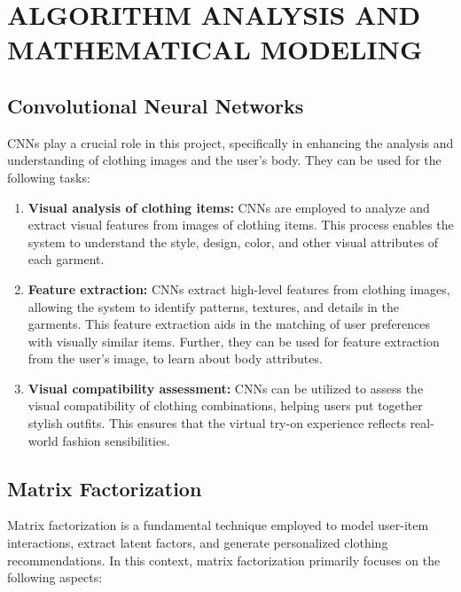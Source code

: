 \chapter{ALGORITHM ANALYSIS AND MATHEMATICAL MODELING}

\section{Convolutional Neural Networks}
	CNNs play a crucial role in this project, specifically in enhancing the analysis and understanding of clothing images and the user's body. They can be used for the following tasks:

	\begin{enumerate}
		\item \textbf{Visual analysis of clothing items:} CNNs are employed to analyze and extract visual features from images of clothing items. This process enables the system to understand the style, design, color, and other visual attributes of each garment.
		\item \textbf{Feature extraction:} CNNs extract high-level features from clothing images, allowing the system to identify patterns, textures, and details in the garments. This feature extraction aids in the matching of user preferences with visually similar items. Further, they can be used for feature extraction from the user's image, to learn about body attributes.
		\item \textbf{Visual compatibility assessment:} CNNs can be utilized to assess the visual compatibility of clothing combinations, helping users put together stylish outfits. This ensures that the virtual try-on experience reflects real-world fashion sensibilities.
	\end{enumerate}

\section{Matrix Factorization}
	Matrix factorization is a fundamental technique employed to model user-item interactions, extract latent factors, and generate personalized clothing recommendations. In this context, matrix factorization primarily focuses on the following aspects:


